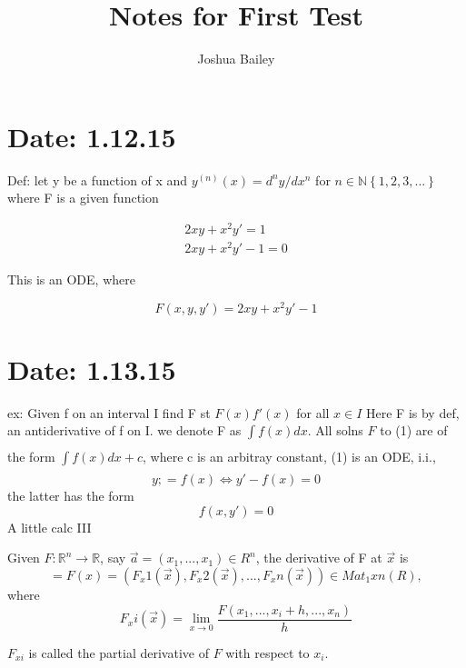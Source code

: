 \documentclass[10pt,a4paper]{article}
\begin{document}
\graphicspath{ {./images/} }
\title{Notes for First Test}
\author{Joshua Bailey}
\maketitle
\newpage 


\section{Date: 1.12.15}
  
Def: let y be a function of x 
and $ y^{(n)}(x) = d^{n}y/dx^{n}$ for $n \in \mathbb{N} \left\{ 1, 2, 3, ...\right\} $ 
where F is a given function 

\begin{gather*}
  2xy + x^{2}y' = 1\\ 
  2xy + x^{2}y'-1 = 0
\end{gather*}

This is an ODE, where 

\begin{equation*}
  F(x,y,y') = 2xy + x^{2}y'-1 
\end{equation*}

\section{Date: 1.13.15}
  ex: Given f on an interval I find F st 
  $F(x)f'(x)$ for all $x \in I$
  Here F is by def, an antiderivative of f
  on I. we denote F as $\int\limits_{}^{}f(x)dx$.
  All solns $F$ to (1) are of the form $\int\limits_{}^{}f(x)dx+c$, 
  where c is an arbitray constant,
  (1) is an ODE, i.i.,
  \begin{equation*}
    y; = f(x) \iff y'-f(x) = 0
  \end{equation*}
  the latter has the form 
  \begin{equation*}
    f(x,y') = 0 
  \end{equation*}
  A little calc III

  Given $F: \mathbb{R}^n \to \mathbb{R}$, 
  say $\vec{a}=(x_1,...,x_1) \in R^n$, 
  the derivative of F at $\vec{x}$ is 
$$    =F(x)=(F_x1(\vec{x}), F_x2(\vec{x}),..., F_xn(\vec{x})) \in Mat_1xn(R),$$ where 
$$    F_xi(\vec{x})=  \lim_{x \to 0} \frac{F(x_1,..., x_i+h,..., x_n)}{h} $$



  $F_{xi}$ is called the partial derivative of $F$
  with respect to $x_i$. 
\end{document}
